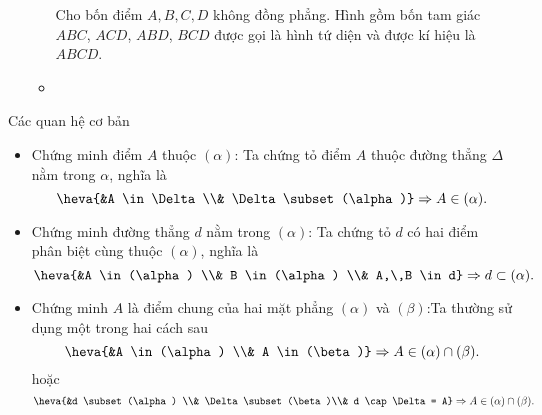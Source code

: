 \begin{enumerate}[\iconMT]
\begin{itemize}
		Cho bốn điểm $A, B, C, D$ không đồng phẳng. Hình gồm bốn tam giác $ABC$, $ACD$, $ABD$, $BCD$ được gọi là hình tứ diện và được kí hiệu là $ABCD$.
		\item[\iconCH]  
	\end{itemize}
\end{enumerate}

\begin{dang}{Các quan hệ cơ bản}
	\begin{itemize}
		\item [\ding{172}] Chứng minh điểm $A$ thuộc $(\alpha)$: Ta chứng tỏ điểm $A$ thuộc đường thẳng $\Delta$ nằm trong $\alpha$, nghĩa là
		$$\heva{&A \in \Delta \\& \Delta \subset (\alpha)} \Rightarrow A \in (\alpha).$$
		\item [\ding{173}] Chứng minh đường thẳng $d$ nằm trong $(\alpha)$: Ta chứng tỏ $d$ có hai điểm phân biệt cùng thuộc $(\alpha)$, nghĩa là
		$$\heva{&A \in (\alpha) \\& B \in (\alpha) \\& A,\,B \in d} \Rightarrow d \subset (\alpha).$$
		\item [\ding{174}] Chứng minh $A$ là điểm chung của hai mặt phẳng $(\alpha)$ và $(\beta)$:Ta thường sử dụng một trong hai cách sau
		$$\heva{&A \in (\alpha) \\& A \in (\beta)} \Rightarrow A \in (\alpha) \cap  (\beta).$$ 
		hoặc 
		$$\heva{&d \subset (\alpha) \\& \Delta \subset (\beta)\\& d \cap \Delta = A} \Rightarrow A \in (\alpha) \cap  (\beta).$$
	\end{itemize}
\end{dang}

